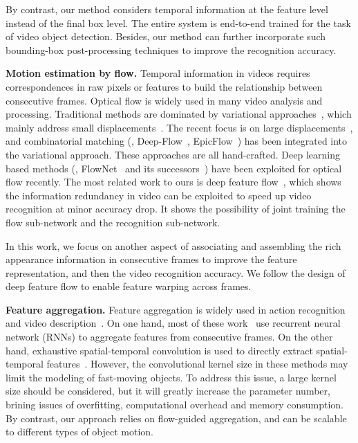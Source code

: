 \documentclass[10pt,twocolumn,letterpaper]{article}
\begin{document}
By contrast, our method considers temporal information at the feature level instead of the final box level. The entire system is end-to-end trained for the task of video object detection. Besides, our method can further incorporate such bounding-box post-processing techniques to improve the recognition accuracy.

\textbf{Motion estimation by flow.} Temporal information in videos requires correspondences in raw pixels or features to build the relationship between consecutive frames. Optical flow is widely used in many video analysis and processing. Traditional methods are dominated by variational approaches~\cite{brox2004high,horn1981determining}, which mainly address small displacements~\cite{weickert2006survey}. The recent focus is on large displacements~\cite{brox2011large}, and combinatorial matching (\eg, Deep-Flow~\cite{weinzaepfel2013deepflow}, EpicFlow~\cite{revaud2015epicflow}) has been integrated into the variational
approach. These approaches are all hand-crafted. Deep learning based methods (\eg, FlowNet~\cite{dosovitskiy2015flownet} and its successors~\cite{ranjan2016optical,ilg2016flownet2}) have been exploited for optical flow recently. The most related work to ours is deep feature flow~\cite{zhu2016dff}, which shows the information redundancy in video can be exploited to speed up video recognition at minor accuracy drop. It shows the possibility of joint training the flow sub-network and the recognition sub-network.

In this work, we focus on another aspect of associating and assembling the rich appearance information in consecutive frames to improve the feature representation, and then the video recognition accuracy. We follow the design of deep feature flow to enable feature warping across frames.

\textbf{Feature aggregation.} Feature aggregation is widely used in action recognition~\cite{sharma2015action,amlan2016adascan,li2016videolstm,yue2015beyond,sun2015human,ballas2015delving,karpathy2014large,tran2015learning} and video description~\cite{donahue2015long,yao2015describing}.
On one hand, most of these work~\cite{sharma2015action,li2016videolstm,yue2015beyond,donahue2015long,yao2015describing,ballas2015delving,fayyaz2016stfcn,siam2016convolutional} use recurrent neural network (RNNs) to aggregate features from consecutive frames. On the other hand, exhaustive spatial-temporal convolution is used to directly extract spatial-temporal features~\cite{sun2015human,karpathy2014large,tran2015learning,tran2016deep}. However, the convolutional kernel size in these methods may limit the modeling of fast-moving objects. To address this issue, a large kernel size should be considered, but it will greatly increase the parameter number, brining issues of overfitting, computational overhead and memory consumption. By contrast, our approach relies on flow-guided aggregation, and can be scalable to different types of object motion.
\end{document}
